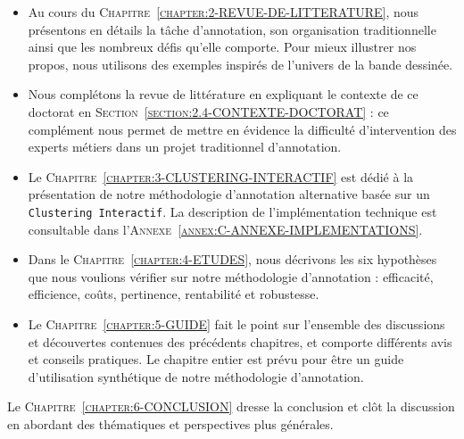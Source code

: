 		\begin{itemize}
			\item Au cours du \textsc{Chapitre~\ref{chapter:2-REVUE-DE-LITTERATURE}}, nous présentons en détails la tâche d'annotation, son organisation traditionnelle ainsi que les nombreux défis qu'elle comporte.
			Pour mieux illustrer nos propos, nous utilisons des exemples inspirés de l'univers de la bande dessinée.
			\item Nous complétons la revue de littérature en expliquant le contexte de ce doctorat en \textsc{Section~\ref{section:2.4-CONTEXTE-DOCTORAT}} : ce complément nous permet de mettre en évidence la difficulté d'intervention des experts métiers dans un projet traditionnel d'annotation.
			\item Le \textsc{Chapitre~\ref{chapter:3-CLUSTERING-INTERACTIF}} est dédié à la présentation de notre méthodologie d'annotation alternative basée sur un \texttt{Clustering Interactif}.
			La description de l'implémentation technique est consultable dans l'\textsc{Annexe~\ref{annex:C-ANNEXE-IMPLEMENTATIONS}}.
			\item Dans le \textsc{Chapitre~\ref{chapter:4-ETUDES}}, nous décrivons les six hypothèses que nous voulions vérifier sur notre méthodologie d'annotation : efficacité, efficience, coûts, pertinence, rentabilité et robustesse.
			\item Le \textsc{Chapitre~\ref{chapter:5-GUIDE}} fait le point sur l'ensemble des discussions et découvertes contenues des précédents chapitres, et comporte différents avis et conseils pratiques.
			Le chapitre entier est prévu pour être un guide d'utilisation synthétique de notre méthodologie d'annotation.
		\end{itemize}
		
		Le \textsc{Chapitre~\ref{chapter:6-CONCLUSION}} dresse la conclusion et clôt la discussion en abordant des thématiques et perspectives plus générales.
